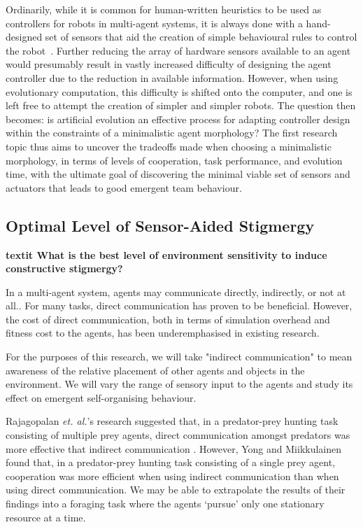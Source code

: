 \documentclass[a4paper,12pt]{article}
\begin{document}
Ordinarily, while it is common for human-written heuristics to be used as controllers for robots in multi-agent systems, it is always done with a hand-designed set of sensors that aid the creation of simple behavioural rules to control the robot~\cite{Jones03}. Further reducing the array of hardware sensors available to an agent would presumably result in vastly increased difficulty of designing the agent controller due to the reduction in available information.
However, when using evolutionary computation, this difficulty is shifted onto the computer, and one is left free to attempt the creation of simpler and simpler robots. The question then becomes: is artificial evolution an effective process for adapting controller design within the constraints of a minimalistic agent morphology? The first research topic thus aims to uncover the tradeoffs made when choosing a minimalistic morphology, in terms of levels of cooperation, task performance, and evolution time, with the ultimate goal of discovering the minimal viable set of sensors and actuators that leads to good emergent team behaviour.

\subsection{Optimal Level of Sensor-Aided Stigmergy}


\textbf{ textit {What is the best level of environment sensitivity to induce constructive stigmergy?}}

In a multi-agent system, agents may communicate directly, indirectly, or not at all.\cite{Panait05}. For many tasks, direct communication has proven to be beneficial. However, the cost of direct communication, both in terms of simulation overhead and fitness cost to the agents, has been underemphasised in existing research\cite{Wagner00}.

For the purposes of this research, we will take "indirect communication" to mean awareness of the relative placement of other agents and objects in the environment. We will vary the range of sensory input to the agents and study its effect on emergent self-organising behaviour.

Rajagopalan \textit{et. al.}’s research suggested that, in a predator-prey hunting task consisting of multiple prey agents, direct communication amongst predators was more effective that indirect communication \cite{Rajagopalan11}. However, Yong and Miikkulainen found that, in a predator-prey hunting task consisting of a single prey agent, cooperation was more efficient when using indirect communication than when using direct communication.\cite{Yong09} We may be able to extrapolate the results of their findings into a foraging task where the agents ‘pursue’ only one stationary resource at a time.
\end{document}
